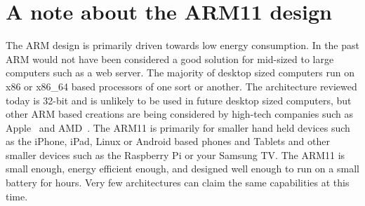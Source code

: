\documentclass[11pt]{report}
\begin{document}
\section{A note about the ARM11 design}
\begin{onehalfspace}
The ARM design is primarily driven towards low energy consumption. In the past ARM would not have been considered a good solution for mid-sized to large computers such as a web server. The majority of desktop sized computers run on x86 or x86\_64 based processors of one sort or another. The architecture reviewed today is 32-bit and is unlikely to be used in future desktop sized computers, but other ARM based creations are being considered by high-tech companies such as Apple~\citep{apple} and AMD~\citep{amd}. The ARM11 is primarily for smaller hand held devices such as the iPhone, iPad, Linux or Android based phones and Tablets and other smaller devices such as the Raspberry Pi or your Samsung TV. The ARM11 is small enough, energy efficient enough, and designed well enough to run on a small battery for hours. Very few architectures can claim the same capabilities at this time. 
\end{onehalfspace}
\clearpage
\printbibliography
\end{document}

